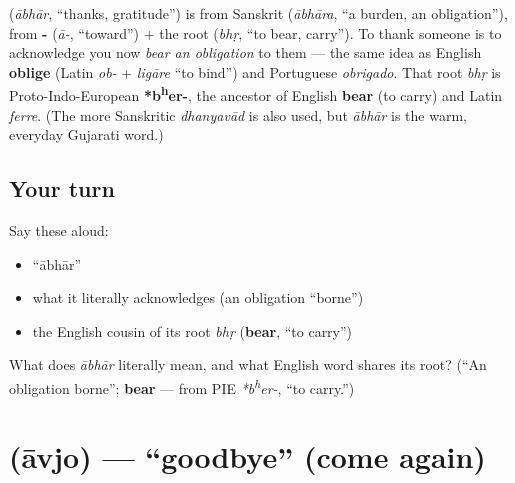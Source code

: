 \begin{cousinweb}
\textbf{} (\emph{ābhār}, \textquotedblleft{}thanks, gratitude\textquotedblright{}) is from Sanskrit \textbf{} (\emph{ābhāra}, \textquotedblleft{}a burden, an obligation\textquotedblright{}), from \textbf{-} (\emph{ā-}, \textquotedblleft{}toward\textquotedblright{}) + the root \textbf{} (\emph{bhṛ}, \textquotedblleft{}to bear, carry\textquotedblright{}). To thank someone is to acknowledge you now \emph{bear an obligation} to them — the same idea as English \textbf{oblige} (Latin \emph{ob-} + \emph{ligāre} \textquotedblleft{}to bind\textquotedblright{}) and Portuguese \emph{obrigado}. That root \emph{bhṛ} is Proto-Indo-European \textbf{*b\textsuperscript{h}er-}, the ancestor of English \textbf{bear} (to carry) and Latin \emph{ferre}. (The more Sanskritic \textbf{} \emph{dhanyavād} is also used, but \emph{ābhār} is the warm, everyday Gujarati word.)
\end{cousinweb}

\subsection*{Your turn}
Say these aloud:

\begin{itemize}
\raggedright
  \item \textquotedblleft{}ābhār\textquotedblright{}
  \item what it literally acknowledges (an obligation \textquotedblleft{}borne\textquotedblright{})
  \item the English cousin of its root \emph{bhṛ} (\textbf{bear}, \textquotedblleft{}to carry\textquotedblright{})
\end{itemize}

\begin{tcolorbox}[breakable,colback=teal!4,colframe=teal!35!black,title={Before you move on}]
What does \emph{ābhār} literally mean, and what English word shares its root? (\textquotedblleft{}An obligation borne\textquotedblright{}; \textbf{bear} — from PIE \emph{*b\textsuperscript{h}er-}, \textquotedblleft{}to carry.\textquotedblright{})
\end{tcolorbox}
\section[\gu{આવજો}]{ (āvjo) — \textquotedblleft{}goodbye\textquotedblright{} (come again)}

\label{lesson:GU-C01-aavjo}



